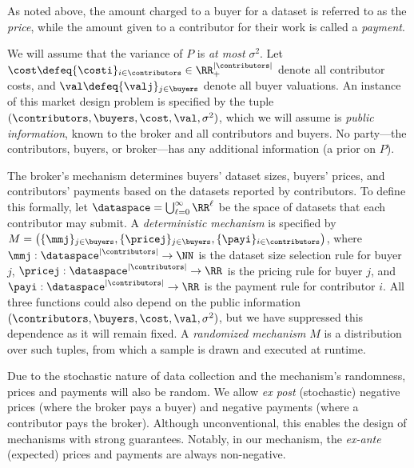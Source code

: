 As noted above, the amount charged to a buyer for a dataset is referred to as the \emph{price}, while the amount given to a contributor for their work is called a \emph{payment}.  




We will assume that the variance of $P$ is \emph{at most} $\sigma^2$.
Let  $\cost \defeq \{\costi\}_{i \in \contributors} \in \RR_+^{|\contributors|}$ denote all contributor costs, and $\val \defeq \{\valj\}_{j \in \buyers}$ denote all buyer valuations.
An instance of this market design problem is specified by the tuple $(\contributors, \buyers, \cost, \val, \sigma^2)$,  which we will assume is \emph{public information},
\ie known to the broker and all contributors and buyers.
No party---the contributors, buyers, or broker---has any additional information (\eg a prior on $P$).




The broker's mechanism determines buyers' dataset sizes, buyers' prices, and contributors' payments based on the  datasets reported by contributors.
To define this formally, let $\dataspace = \bigcup_{\ell=0}^\infty \RR^\ell$
be the space of datasets that each contributor may submit.
A \emph{deterministic mechanism} is specified by  
$M = \left(\{\mmj\}_{j \in \buyers}, \{\pricej\}_{j \in \buyers}, \{\payi\}_{i \in \contributors}\right)
$,
where $\mmj : \dataspace^{|\contributors|} \to \NN$
is the dataset size selection rule for buyer $j$,  
$\pricej : \dataspace^{|\contributors|} \to \RR$ is the pricing rule for buyer $j$, and  
$\payi : \dataspace^{|\contributors|} \to \RR$ is the payment rule for contributor $i$. 
All three functions could also depend on the public information $(\contributors, \buyers, \cost,\val, \sigma^2)$, but we have suppressed this dependence as it will remain fixed.
A \emph{randomized mechanism} $M$ is a distribution over such tuples, from which a sample is drawn and executed at runtime.

Due to the stochastic nature of data collection and the mechanism's randomness, prices and payments will also be random. We allow \emph{ex post} (\ie stochastic) negative prices (where the broker pays a buyer) and negative payments (where a contributor pays the broker). Although unconventional, this enables the design of mechanisms with strong guarantees. Notably, in our mechanism, the \emph{ex-ante} (\ie expected) prices and payments are always non-negative.


